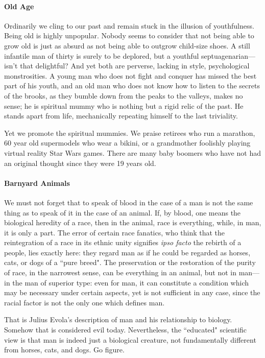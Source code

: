 \paragraph{Old Age}
\begin{quotex}
Ordinarily we cling to our past and remain stuck in the illusion of youthfulness. Being old is highly unpopular. Nobody seems to consider that not being able to grow old is just as absurd as not being able to outgrow child-size shoes. A still infantile man of thirty is surely to be deplored, but a youthful septuagenarian—isn't that delightful? And yet both are perverse, lacking in style, psychological monstrosities. A young man who does not fight and conquer has missed the best part of his youth, and an old man who does not know how to listen to the secrets of the brooks, as they bumble down from the peaks to the valleys, makes no sense; he is spiritual mummy who is nothing but a rigid relic of the past. He stands apart from life, mechanically repeating himself to the last triviality. 

\end{quotex}
Yet we promote the spiritual mummies. We praise retirees who run a marathon, 60 year old supermodels who wear a bikini, or a grandmother foolishly playing virtual reality Star Wars games. There are many baby boomers who have not had an original thought since they were 19 years old.

\paragraph{Barnyard Animals}
\begin{quotex}
We must not forget that to speak of blood in the case of a man is not the same thing as to speak of it in the case of an animal. If, by blood, one means the biological heredity of a race, then in the animal, race is everything, while, in man, it is only a part. The error of certain race fanatics, who think that the reintegration of a race in its ethnic unity signifies \emph{ipso facto} the rebirth of a people, lies exactly here: they regard man as if he could be regarded as horses, cats, or dogs of a ``pure breed". The preservation or the restoration of the purity of race, in the narrowest sense, can be everything in an animal, but not in man—in the man of superior type: even for man, it can constitute a condition which may be necessary under certain aspects, yet is not sufficient in any case, since the racial factor is not the only one which defines man. 

\end{quotex}
That is Julius Evola's description of man and his relationship to biology. Somehow that is considered evil today. Nevertheless, the ``educated" scientific view is that man is indeed just a biological creature, not fundamentally different from horses, cats, and dogs. Go figure.

